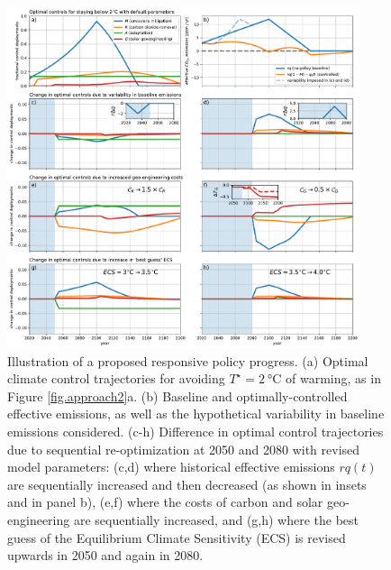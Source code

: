 \documentclass{article}
\begin{document}
\begin{figure}[htb!]
\noindent\includegraphics[width=0.925\textwidth]{figures/policy_updates.pdf}
\centering
\caption{Illustration of a proposed responsive policy progress. (a) Optimal climate control trajectories for avoiding $T^{\star} = \SI{2}{\celsius}$ of warming, as in Figure \ref{fig.approach2}a. (b) Baseline and optimally-controlled effective emissions, as well as the hypothetical variability in baseline emissions considered. (c-h) Difference in optimal control trajectories due to sequential re-optimization at 2050 and 2080 with revised model parameters: (c,d) where historical effective emissions $rq(t)$ are sequentially increased and then decreased (as shown in insets and in panel b), (e,f) where the costs of carbon and solar geo-engineering are sequentially increased, and (g,h) where the best guess of the Equilibrium Climate Sensitivity (ECS) is revised upwards in 2050 and again in 2080.}
\label{fig.policy_updates}
\end{figure}


\end{document}

